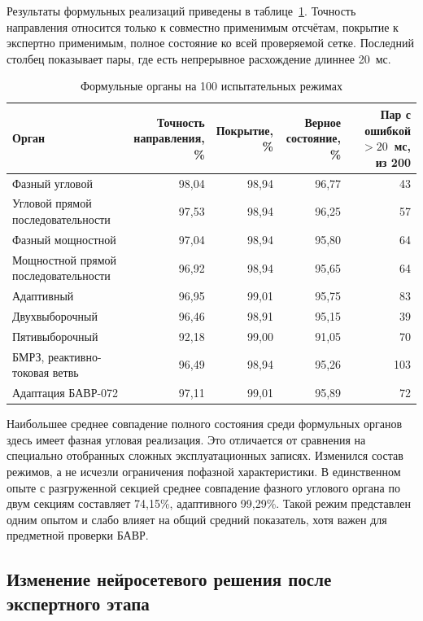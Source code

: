 Результаты формульных реализаций приведены
в таблице~\ref{tab:ch5_rtds_analytical}.
Точность направления относится только к совместно применимым
отсчётам, покрытие к экспертно применимым,
полное состояние ко всей проверяемой сетке.
Последний столбец показывает пары,
где есть непрерывное расхождение длиннее 20~мс.

\begin{table}[htbp]
\centering\small
\caption{Формульные органы на 100 испытательных режимах}
\label{tab:ch5_rtds_analytical}
\setlength{\tabcolsep}{3pt}
\begin{tabular}{p{}rrrr}
\toprule
Орган & \shortstack{Точность\\направления, \%}
 & \shortstack{Покрытие,\\\%}
 & \shortstack{Верное\\состояние, \%}
 & \shortstack{Пар с ошибкой\\$>20$~мс, из 200} \\
\midrule
Фазный угловой & 98,04 & 98,94 & 96,77 & 43 \\
Угловой прямой последовательности & 97,53 & 98,94 & 96,25 & 57 \\
Фазный мощностной & 97,04 & 98,94 & 95,80 & 64 \\
Мощностной прямой последовательности & 96,92 & 98,94 & 95,65 & 64 \\
Адаптивный & 96,95 & 99,01 & 95,75 & 83 \\
Двухвыборочный & 96,46 & 98,91 & 95,15 & 39 \\
Пятивыборочный & 92,18 & 99,00 & 91,05 & 70 \\
БМРЗ, реактивно-токовая ветвь & 96,49 & 98,94 & 95,26 & 103 \\
Адаптация БАВР-072 & 97,11 & 99,01 & 95,89 & 72 \\
\bottomrule
\end{tabular}
\end{table}

Наибольшее среднее совпадение полного состояния
среди формульных органов здесь имеет фазная угловая реализация.
Это отличается от сравнения на специально отобранных
сложных эксплуатационных записях.
Изменился состав режимов,
а не исчезли ограничения пофазной характеристики.
В единственном опыте с разгруженной секцией
среднее совпадение фазного углового органа по двум секциям
составляет 74,15\%, адаптивного 99,29\%.
Такой режим представлен одним опытом
и слабо влияет на общий средний показатель,
хотя важен для предметной проверки БАВР.

\subsection{Изменение нейросетевого решения после экспертного этапа}

